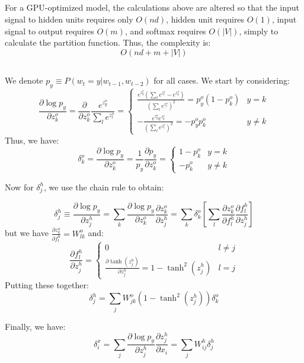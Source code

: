 \documentclass[psamsfonts]{amsart}
\theoremstyle{definition}
\theoremstyle{remark}
\numberwithin{equation}{section}
\begin{document}
\subsection{} For a GPU-optimized model, the calculations above are altered so that the input signal to hidden units requires only $O(nd)$, hidden unit requires $O(1)$, input signal to output requires $O(m)$, and softmax requires $O(|V|)$, simply to calculate the partition function. Thus, the complexity is:
$$O(nd + m + |V|)$$

\subsection{} We denote $p_y \equiv P(w_t = y|w_{t-1}, w_{t-2})$ for all cases. We start by considering:
$$\frac{\partial \log p_y}{\partial z_{k}^o} = \frac{\partial}{\partial z_k^o} \frac{e^{z_y^o}}{\sum_l e^{z_l^o}} = \left\{ \begin{matrix} \frac{e^{z_y^o}\left( \sum_l e^{z_l^o} - e^{z_k^o} \right)}{\left(\sum_l e^{z_l^o} \right)^2} = p_y^o(1-p_k^o) & y = k \\ -\frac{e^{z_y^o}e^{z_k^o}}{\left(\sum_l e^{z_l^o} \right)^2} = -p_y^o p_k^o & y \neq k \end{matrix} \right.$$
Thus, we have:
$$\delta_k^o = \frac{\partial \log p_y}{\partial z_k^o} = \frac{1}{p_y} \frac{\partial p_y}{\partial z_k^o} = \left\{ \begin{matrix} 1-p_k^o & y = k \\ -p_k^o & y\neq k \end{matrix} \right.$$

Now for $\delta_j^h$, we use the chain rule to obtain:

$$\delta_j^h \equiv \frac{\partial \log p_y}{\partial z_j^h} = \sum_k \frac{\partial \log p_y}{\partial z_k^o} \frac{\partial z_k^o}{\partial z_j^h} = \sum_k \delta_k^o \left[ \sum_l \frac{\partial z_k^o}{\partial f_l^h}\frac{\partial f_l^h}{\partial z_j^h} \right]$$
but we have $\frac{\partial z_k^o}{\partial f_l^h} = W_{lk}^o$ and:
$$\frac{\partial f_l^h}{\partial z_j^h} = \left\{ \begin{matrix} 0 & l \neq j \\ \frac{\partial \tanh(z_j^h)}{\partial z_j^h} = 1-\tanh^2(z_j^h) & l = j \end{matrix} \right.$$
Putting these together:
$$\delta_j^h = \sum_j W_{jk}^o (1-\tanh^2(z_j^h)) \delta_k^o$$

Finally, we have:
$$\delta_i^x = \sum_j \frac{\partial \log p_y}{\partial z_j^h}\frac{\partial z_j^h}{\partial x_i} = \sum_j W_{ij}^h\delta_j^h$$
\end{document}
